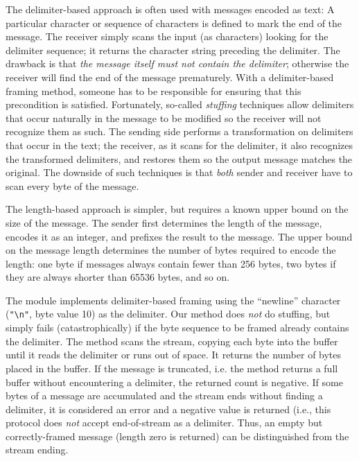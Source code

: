 The delimiter-based approach is often used with messages encoded as text:
A particular character 
or sequence of characters is defined to mark the end of the message.
The receiver simply scans the input (as characters) looking for the delimiter
sequence; it returns the character string preceding the delimiter.
The drawback is that \emph{the message itself must not contain the delimiter};
otherwise the receiver will find the end of the message prematurely.
With a delimiter-based framing method, someone has to be
responsible for ensuring that this precondition is satisfied.
%
Fortunately, so-called \emph{stuffing\/} techniques allow delimiters
that occur naturally in the message to be modified so the receiver
will not recognize them as such.  The sending side performs a
transformation on delimiters that occur in the text;
the receiver, as it scans for the delimiter, it
also recognizes the transformed delimiters, and restores them so the
output message matches the original.
The downside of such techniques is that \emph{both\/}
sender and receiver have to scan every byte of the message.

The length-based approach is simpler, but requires a known upper bound
on the size of the message.  The sender first determines the length of
the message, encodes it as an integer, and prefixes the result to the
message.  The upper bound on the message length determines the number
of bytes required to encode the length: one byte if messages always
contain fewer than 256 bytes, two bytes if they are always shorter
than 65536 bytes, and so on.

The module  implements delimiter-based framing
using the ``newline'' character (\verb+"\n"+, byte value 10) as the
delimiter.  Our  method does
\emph{not\/} do stuffing, but simply fails (catastrophically) if the
byte sequence to be framed already contains the delimiter.
%
The  method scans the stream, copying each byte
into the buffer until it reads the delimiter or runs out of space.
It returns the number of bytes placed in the buffer.
If the message is truncated, i.e. the method returns a full buffer
without encountering a delimiter, the returned count is negative.
If some bytes of a message are
accumulated and the stream ends without finding a delimiter,
it is considered an error and a negative value is returned (i.e., this
protocol does \emph{not\/} accept end-of-stream as a delimiter.
Thus, an empty but correctly-framed message (length zero is returned)
can be distinguished from the stream ending.

